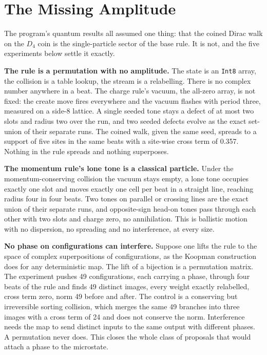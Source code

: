 \section{The Missing Amplitude}
\label{sec:amplitude}

The program's quantum results all assumed one thing: that the coined Dirac walk on the $D_4$ coin is the
single-particle sector of the base rule. It is not, and the five experiments below settle it exactly.

\textbf{The rule is a permutation with no amplitude.} The state is an \texttt{Int8} array, the collision is a table
lookup, the stream is a relabelling. There is no complex number anywhere in a beat. The charge rule's vacuum, the
all-zero array, is not fixed: the create move fires everywhere and the vacuum flashes with period three, measured on
a side-8 lattice. A single seeded tone stays a defect of at most two slots and radius two over the run, and two
seeded defects evolve as the exact set-union of their separate runs. The coined walk, given the same seed, spreads to
a support of five sites in the same beats with a site-wise cross term of 0.357. Nothing in the rule spreads and
nothing superposes.

\textbf{The momentum rule's lone tone is a classical particle.} Under the momentum-conserving collision the vacuum
stays empty, a lone tone occupies exactly one slot and moves exactly one cell per beat in a straight line, reaching
radius four in four beats. Two tones on parallel or crossing lines are the exact union of their separate runs, and
opposite-sign head-on tones pass through each other with two slots and charge zero, no annihilation. This is ballistic
motion with no dispersion, no spreading and no interference, at every size.

\textbf{No phase on configurations can interfere.} Suppose one lifts the rule to the space of complex superpositions
of configurations, as the Koopman construction does for any deterministic map. The lift of a bijection is a
permutation matrix. The experiment pushes 49 configurations, each carrying a phase, through four beats of the rule
and finds 49 distinct images, every weight exactly relabelled, cross term zero, norm 49 before and after. The control
is a conserving but irreversible sorting collision, which merges the same 49 branches into three images with a cross
term of 24 and does not conserve the norm. Interference needs the map to send distinct inputs to the same output with
different phases. A permutation never does. This closes the whole class of proposals that would attach a phase to
the microstate.

